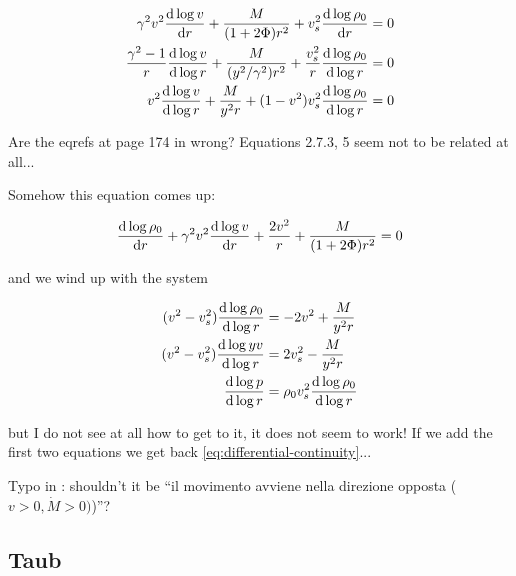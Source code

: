 \documentclass[main.tex]{subfiles}
\begin{document}
\begin{subequations}
\begin{align}
  \gamma^2 v^2 \dv{\log v}{r} + \frac{M}{(1+ 2 \Phi) r^2} + v_s^2 \dv{\log \rho_0}{r}  &= 0 \\
  \frac{\gamma^2 - 1}{r}  \dv{\log v}{\log r} + \frac{M}{(y^2/\gamma^2) r^2}
  + \frac{v_s^2}{r} \dv{\log \rho_0}{\log r}  &= 0  \\
  v^2  \dv{\log v}{\log r} + \frac{M}{y^2 r}
  + (1-v^2) v_s^2 \dv{\log \rho_0}{\log r}  &= 0
\end{align}
\end{subequations}

\begin{greenbox}
  Are the eqrefs at page 174 in \cite{Nobili:2000} wrong? Equations 2.7.3, 5 seem not to be related at all...

  Somehow this equation comes up:

  \begin{equation}
    \dv{\log \rho_0 }{r} + \gamma^2 v^2 \dv{\log v }{r}  + \frac{2 v^2}{r} + \frac{M}{(1+2 \Phi) r^2} = 0
  \end{equation}

  and we wind up with the system

  \begin{subequations}
  \begin{align}
    (v^2-v_s^2) \dv{\log \rho_0}{\log r} &= - 2v^2 + \frac{M}{y^2 r}  \\
    (v^2-v_s^2) \dv{\log yv }{\log r} &=  2v_s^2 - \frac{M}{y^2 r}  \\
    \dv{\log p }{\log r} &= \rho_0 v_s^2 \dv{\log \rho_0}{\log r }
  \end{align}
  \end{subequations}

  but I do not see at all how to get to it, it does not seem to work!
  If we add the first two equations we get back \eqref{eq:differential-continuity}...
\end{greenbox}

\begin{greenbox}
  Typo in \cite[page 175]{Nobili:2000}: shouldn't it be ``il movimento avviene nella direzione opposta (\(v>0, \dot{M}>0)\))''?
\end{greenbox}

\subsection{Taub}
\end{document}
